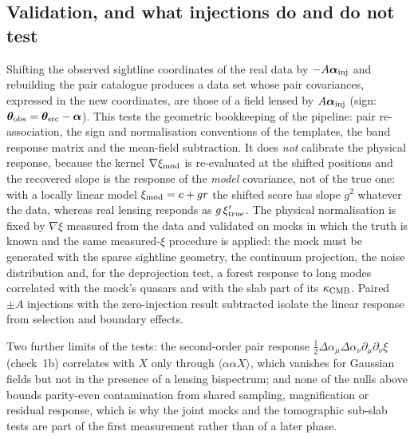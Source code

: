 \documentclass[11pt,a4paper]{article}
\newcommand{\vth}{\bm{\theta}}
\newcommand{\kcmb}{\kappa_{\rm CMB}}
\begin{document}
\subsection{Validation, and what injections do and do not test}
\label{sec:pair-valid}
Shifting the observed sightline coordinates of the real data by $-A\bm\alpha_{\rm inj}$ and rebuilding the pair catalogue produces a data set whose pair covariances, expressed in the new coordinates, are those of a field lensed by $A\bm\alpha_{\rm inj}$ (sign: $\vth_{\rm obs}=\vth_{\rm src}-\bm\alpha$). This tests the geometric bookkeeping of the pipeline: pair re-association, the sign and normalisation conventions of the templates, the band response matrix and the mean-field subtraction. It does \emph{not} calibrate the physical response, because the kernel $\nabla\xi_{\rm mod}$ is re-evaluated at the shifted positions and the recovered slope is the response of the \emph{model} covariance, not of the true one: with a locally linear model $\xi_{\rm mod}=c+gr$ the shifted score has slope $g^2$ whatever the data, whereas real lensing responds as $g\,\xi'_{\rm true}$. The physical normalisation is fixed by $\nabla\xi$ measured from the data and validated on mocks in which the truth is known and the same measured-$\xi$ procedure is applied: the mock must be generated with the sparse sightline geometry, the continuum projection, the noise distribution and, for the deprojection test, a forest response to long modes correlated with the mock's quasars and with the slab part of its $\kcmb$. Paired $\pm A$ injections with the zero-injection result subtracted isolate the linear response from selection and boundary effects.

Two further limits of the tests: the second-order pair response $\tfrac12\Delta\alpha_\mu\Delta\alpha_\nu\partial_\mu\partial_\nu\xi$ (check~1b) correlates with $X$ only through $\langle\alpha\alpha X\rangle$, which vanishes for Gaussian fields but not in the presence of a lensing bispectrum; and none of the nulls above bounds parity-even contamination from shared sampling, magnification or residual response, which is why the joint mocks and the tomographic sub-slab tests are part of the first measurement rather than of a later phase.
\end{document}
